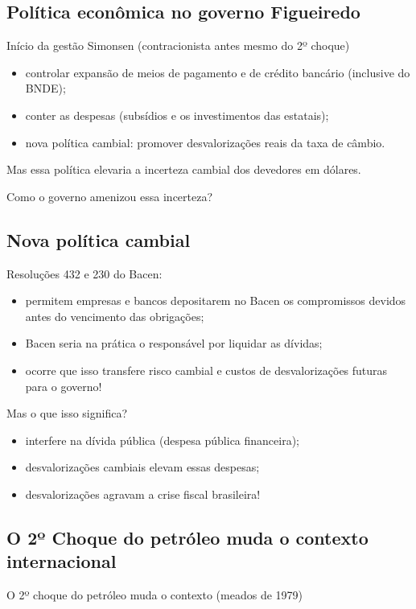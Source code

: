 \documentclass[a4paper,12pt]{article}[abntex2]
\begin{document}
\subsection{\textbf{Política econômica no governo Figueiredo}}
Início da gestão Simonsen (contracionista antes mesmo do 2º choque)\begin{itemize}
    \item controlar expansão de meios de pagamento e de crédito bancário (inclusive do BNDE);
    \item conter as despesas (subsídios e os investimentos das estatais);
    \item nova política cambial: promover desvalorizações reais da taxa de câmbio.
\end{itemize}

Mas essa política elevaria a incerteza cambial dos devedores em dólares.

Como o governo amenizou essa incerteza? 

\subsection{\textbf{Nova política cambial}}
Resoluções 432 e 230 do Bacen:\begin{itemize}
    \item permitem empresas e bancos depositarem no Bacen os compromissos devidos antes do vencimento das obrigações; 
    \item Bacen seria na prática o responsável por liquidar as dívidas;
    \item ocorre que isso transfere risco cambial  e custos de desvalorizações futuras para o governo!
\end{itemize}

Mas o que isso significa?\begin{itemize}
    \item interfere na dívida pública (despesa pública financeira);
    \item desvalorizações cambiais elevam essas despesas;
    \item desvalorizações agravam a crise fiscal brasileira!
\end{itemize}

\subsection{\textbf{O 2º Choque do petróleo muda o contexto internacional}}
O 2º choque do petróleo muda o contexto (meados de 1979) 
\end{document}
